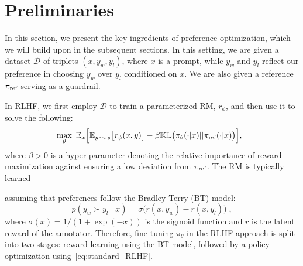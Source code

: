 \section{Preliminaries} \label{sec:prelim}

In this section, we present the key ingredients of preference optimization, which we will build upon in the subsequent sections. In this setting, we are given a dataset $\mathcal{D}$ of triplets $(x , y_w , y_l)$, where $x$ is a prompt, while $y_w$ and $y_l$ reflect our preference in choosing $y_w$ over $y_l$ conditioned on $x$. We are also given a reference $\pi_{\textrm{ref}}$ serving as a guardrail.

In RLHF, we first employ $\mathcal{D}$ to train a parameterized RM, $r_\phi$, and then use it to solve the following:
%
\begin{equation} \label{eq:standard_RLHF}
    \!\!\!\!\max_{\theta}\ \mathbb{E}_{x}\Big[ \mathbb{E}_{y \sim \pi_{\theta}}\big[r_\phi(x,y)\big] - \beta \mathbb{KL}\big(\pi_{\theta}(\cdot|x)||\pi_{\textrm{ref}}(\cdot|x)\big)\Big],
\end{equation}
%
where $\beta > 0$ is a hyper-parameter denoting the relative importance of reward maximization against ensuring a low deviation from $\pi_{\textrm{ref}}$. The RM is typically learned 
\iffalse
using the cross-entropy (CE) loss:
%
\begin{equation} \label{eq:reward-CE-loss}
\mathcal L(\phi,\mathcal D) := - \hspace{-0.2in}\sum_{(x,y_w,y_l)\in\mathcal D} \hspace{-0.1in} \log\sigma\big(r_\phi(x,y_w) - r_\phi(x,y_l)\big)\;,
\end{equation}
%
\fi
assuming that preferences follow the Bradley-Terry (BT) model:
%
\begin{equation}
p(y_w \succ y_l \mid x) = \sigma\big(r(x,y_w) - r(x,y_l)\big)\;,
\label{eq:standard_BT}    
\end{equation}
%
where $\sigma(x) = 1/(1+\exp(-x))$ is the sigmoid function and $r$ is the latent reward of the annotator. Therefore, fine-tuning $\pi_\theta$ in the RLHF approach is split into two stages: reward-learning using the BT model, followed by a policy optimization using~\eqref{eq:standard_RLHF}.

